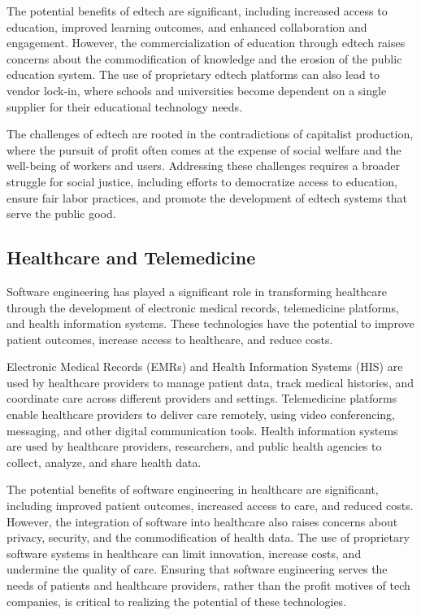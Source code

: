 \begin{refsection}
\begin{multicols}{2}
{The potential benefits of edtech are significant, including increased access to education, improved learning outcomes, and enhanced collaboration and engagement. However, the commercialization of education through edtech raises concerns about the commodification of knowledge and the erosion of the public education system. The use of proprietary edtech platforms can also lead to vendor lock-in, where schools and universities become dependent on a single supplier for their educational technology needs.

The challenges of edtech are rooted in the contradictions of capitalist production, where the pursuit of profit often comes at the expense of social welfare and the well-being of workers and users. Addressing these challenges requires a broader struggle for social justice, including efforts to democratize access to education, ensure fair labor practices, and promote the development of edtech systems that serve the public good.

\subsection{Healthcare and Telemedicine}

Software engineering has played a significant role in transforming healthcare through the development of electronic medical records, telemedicine platforms, and health information systems. These technologies have the potential to improve patient outcomes, increase access to healthcare, and reduce costs.

Electronic Medical Records (EMRs) and Health Information Systems (HIS) are used by healthcare providers to manage patient data, track medical histories, and coordinate care across different providers and settings. Telemedicine platforms enable healthcare providers to deliver care remotely, using video conferencing, messaging, and other digital communication tools. Health information systems are used by healthcare providers, researchers, and public health agencies to collect, analyze, and share health data.

The potential benefits of software engineering in healthcare are significant, including improved patient outcomes, increased access to care, and reduced costs. However, the integration of software into healthcare also raises concerns about privacy, security, and the commodification of health data. The use of proprietary software systems in healthcare can limit innovation, increase costs, and undermine the quality of care. Ensuring that software engineering serves the needs of patients and healthcare providers, rather than the profit motives of tech companies, is critical to realizing the potential of these technologies.

}
\end{multicols}
\end{refsection}
